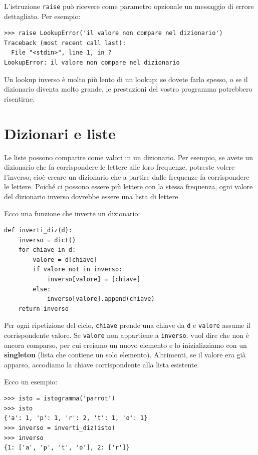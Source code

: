 \documentclass[10pt]{book}
\begin{document}
L'istruzione {\tt raise} può ricevere come parametro opzionale un messaggio di errore dettagliato. Per esempio:

\begin{verbatim}
>>> raise LookupError('il valore non compare nel dizionario')
Traceback (most recent call last):
  File "<stdin>", line 1, in ?
LookupError: il valore non compare nel dizionario
\end{verbatim}
%

Un lookup inverso è molto più lento di un lookup; se dovete farlo spesso, o se il dizionario diventa molto grande, le prestazioni del vostro programma potrebbero risentirne.


\section{Dizionari e liste}
\label{invert}

Le liste possono comparire come valori in un dizionario. Per esempio, se avete un dizionario che fa corrispondere le lettere alle loro frequenze, potreste volere l'inverso; cioè creare un dizionario che a partire dalle frequenze fa corrispondere le lettere. Poiché ci possono essere più lettere con la stessa frequenza, ogni valore del dizionario inverso dovrebbe essere una lista di lettere.

Ecco una funzione che inverte un dizionario:

\begin{verbatim}
def inverti_diz(d):
    inverso = dict()
    for chiave in d:
        valore = d[chiave]
        if valore not in inverso:
            inverso[valore] = [chiave]
        else:
            inverso[valore].append(chiave)
    return inverso
\end{verbatim}
%
Per ogni ripetizione del ciclo, {\tt chiave} prende una chiave da {\tt d} e 
{\tt valore} assume il corrispondente valore.  Se {\tt valore} non appartiene a  {\tt inverso}, vuol dire che non è ancora comparso, per cui creiamo un nuovo elemento e lo inizializziamo con un {\bf singleton} (lista che contiene un solo elemento).  Altrimenti, se il valore era già apparso, accodiamo la chiave corrispondente alla lista esistente.

Ecco un esempio:

\begin{verbatim}
>>> isto = istogramma('parrot')
>>> isto
{'a': 1, 'p': 1, 'r': 2, 't': 1, 'o': 1}
>>> inverso = inverti_diz(isto)
>>> inverso
{1: ['a', 'p', 't', 'o'], 2: ['r']}
\end{verbatim}
\end{document}
